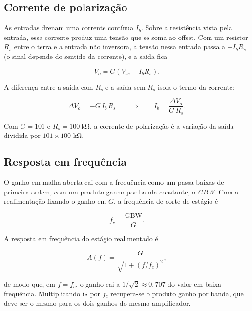 \documentclass[11pt,a4paper]{article}
\begin{document}
\subsection{Corrente de polarização}

As entradas drenam uma corrente contínua $I_b$. Sobre a resistência vista pela entrada, essa corrente produz uma tensão que se soma ao offset. Com um resistor $R_s$ entre o terra e a entrada não inversora, a tensão nessa entrada passa a $-I_b R_s$ (o sinal depende do sentido da corrente), e a saída fica

\begin{equation}
V_o = G \left( V_{os} - I_b R_s \right) .
\label{eq:polarizacao}
\end{equation}

A diferença entre a saída com $R_s$ e a saída sem $R_s$ isola o termo da corrente:

\begin{equation}
\Delta V_o = -G \, I_b \, R_s \qquad \Rightarrow \qquad I_b = \frac{\Delta V_o}{G \, R_s} .
\label{eq:ib}
\end{equation}

Com $G = 101$ e $R_s = \SI{100}{\kilo\ohm}$, a corrente de polarização é a variação da saída dividida por $101 \times 100$ kΩ.

\subsection{Resposta em frequência}

O ganho em malha aberta cai com a frequência como um passa-baixas de primeira ordem, com um produto ganho por banda constante, o \textit{GBW}. Com a realimentação fixando o ganho em $G$, a frequência de corte do estágio é

\begin{equation}
f_c = \frac{\text{GBW}}{G} .
\label{eq:fc}
\end{equation}

A resposta em frequência do estágio realimentado é

\begin{equation}
A(f) = \frac{G}{\sqrt{1 + (f/f_c)^2}} ,
\label{eq:resposta}
\end{equation}

de modo que, em $f = f_c$, o ganho cai a $1/\sqrt{2} \approx 0{,}707$ do valor em baixa frequência. Multiplicando $G$ por $f_c$ recupera-se o produto ganho por banda, que deve ser o mesmo para os dois ganhos do mesmo amplificador.
\end{document}
